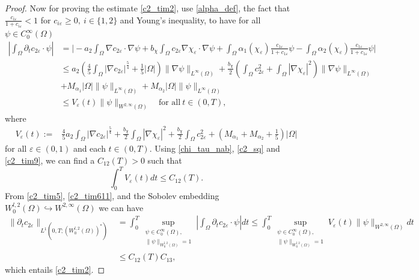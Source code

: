 \documentclass[10pt,a4paper]{amsart}
\begin{document}
\begin{proof}
\noindent
Now for proving the estimate \eqref{c2_tim2}, use \eqref{alpha_def}, the fact that $\frac{c_{i\varepsilon}}{1 + c_{i\varepsilon}} < 1$ for $c_{i\varepsilon} \geq 0,\ i \in \{1, 2\}$ and Young's inequality, to have for all $\psi \in C_0^\infty(\Omega)$
  \begin{align}
  \label{c2_tim5}
    \nonumber \left|\int_\Omega \partial_t c_{2\varepsilon} \cdot \psi\right| & = \bigg| - a_2 \int_\Omega \nabla c_{2\varepsilon} \cdot \nabla \psi + b_\chi \int_\Omega c_{2\varepsilon} \nabla \chi_\varepsilon \cdot \nabla \psi  + \int_\Omega \alpha_1(\chi_\varepsilon)\tfrac{c_{1\varepsilon}}{1 + c_{1\varepsilon}}  \psi - \int_\Omega \alpha_2(\chi_\varepsilon)\tfrac{c_{1\varepsilon}}{1 + c_{1\varepsilon}} \psi  \bigg| \\[5pt]
    \nonumber & \leq a_2 \left(\frac{4}{5} \int_\Omega |\nabla c_{2\varepsilon}|^{\frac{5}{4}} + \frac{1}{5} |\Omega|\right)\|\nabla \psi\|_{L^\infty(\Omega)} + \frac{b_\chi}{2} \left(\int_\Omega c_{2\varepsilon}^2 + \int_\Omega |\nabla \chi_\varepsilon|^2\right)\|\nabla \psi\|_{L^\infty(\Omega)} \\[5pt]
    \nonumber & + M_{\alpha_1} |\Omega| \| \psi\|_{L^\infty(\Omega)} +  M_{\alpha_2}  |\Omega| \| \psi\|_{L^\infty(\Omega)}\\[5pt]
    & \leq V_\varepsilon(t) \|\psi\|_{W^{2, \infty}(\Omega)} \quad \text{for all} ~ t \in (0, T),
  \end{align}
   where
  \begin{align*}
    V_\varepsilon(t) := & \frac{4}{5} a_2 \int_\Omega |\nabla c_{2\varepsilon}|^{\frac{5}{4}} + \frac{b_\chi}{2} \int_\Omega |\nabla \chi_\varepsilon|^2 + \frac{b_\chi}{2} \int_\Omega c_{2\varepsilon}^2 + (M_{\alpha_1} + M_{\alpha_2} + \tfrac{1}{5})|\Omega|
  \end{align*}
for all $\varepsilon \in (0, 1)$ and each $t \in (0, T)$. Using \eqref{chi_tau_nab}, \eqref{c2_sq} and \eqref{c2_tim9}, we can find a $C_{12}(T) > 0$ such that
\begin{equation}
 \label{c2_tim611}
  \int_0^T V_\varepsilon(t) dt \leq C_{12}(T).
\end{equation}
From \eqref{c2_tim5}, \eqref{c2_tim611}, and the Sobolev embedding $W_0^{l, 2}(\Omega) \hookrightarrow W^{2, \infty}(\Omega)$ we can have
\begin{align*}
   \|\partial_t c_{2\varepsilon}\|_{L^1(0, T; (W_0^{l, 2}(\Omega))^\ast)} & = \int_0^T \sup_{\substack{\psi \in C_0^\infty(\Omega),\\ \|\psi\|_{W^{l, 2}_0(\Omega)} = 1}} \left|\int_\Omega \partial_t c_{2\varepsilon} \cdot \psi \right| dt  \leq \int_0^T \sup_{\substack{\psi \in C_0^\infty(\Omega),\\ \|\psi\|_{W^{l, 2}_0(\Omega)} = 1}} V_\varepsilon(t) \|\psi\|_{W^{2, \infty}(\Omega)} dt  \\[5pt]
   & \leq C_{12}(T) C_{13},
  \end{align*}
which entails \eqref{c2_tim2}.
\end{proof}
\end{document}
